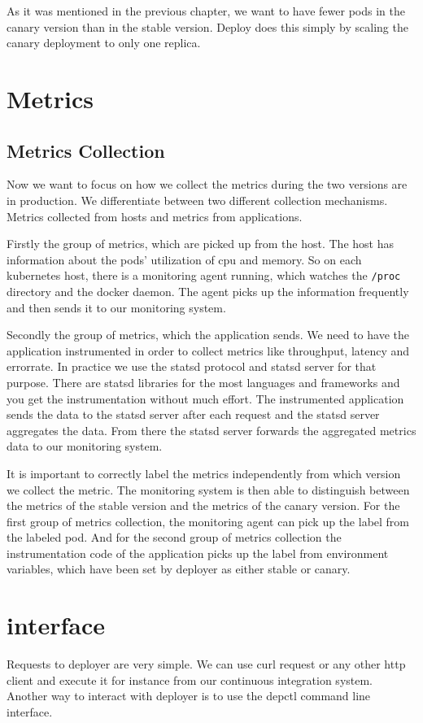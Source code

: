 As it was mentioned in the previous chapter, we want to have fewer pods in the canary
version than in the stable version. Deploy does this simply by scaling the canary
deployment to only one replica.

\section{Metrics}

\subsection{Metrics Collection}

Now we want to focus on how we collect the metrics during the two versions are in
production. We differentiate between two different collection mechanisms. Metrics
collected from hosts and metrics from applications.

Firstly the group of metrics, which are picked up from the host. The host has information
about the pods' utilization of cpu and memory. So on each kubernetes host, there is a
monitoring agent running, which watches the \verb!/proc! directory and the docker
daemon. The agent picks up the information frequently and then sends it to our monitoring
system.

Secondly the group of metrics, which the application sends. We need to have the
application instrumented in order to collect metrics like throughput, latency and
errorrate. In practice we use the statsd protocol and statsd server for that
purpose. There are statsd libraries for the most languages and frameworks and you get the
instrumentation without much effort. The instrumented application sends the data to the
statsd server after each request and the statsd server aggregates the data. From there the
statsd server forwards the aggregated metrics data to our monitoring system.

It is important to correctly label the metrics independently from which version we collect
the metric. The monitoring system is then able to distinguish between the metrics of the
stable version and the metrics of the canary version. For the first group of metrics
collection, the monitoring agent can pick up the label from the labeled pod. And for the
second group of metrics collection the instrumentation code of the application picks up
the label from environment variables, which have been set by deployer as either stable or
canary.

\section{interface}
Requests to deployer are very simple. We can use curl request or any other http client and
execute it for instance from our continuous integration system. Another way to interact
with deployer is to use the depctl command line interface.

